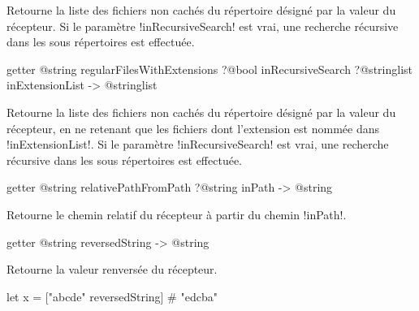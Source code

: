 Retourne la liste des fichiers non cachés du répertoire désigné par la valeur du récepteur. Si le paramètre \ggs!inRecursiveSearch! est vrai, une recherche récursive dans les sous répertoires est effectuée.










\begin{galgasbox}
getter @string regularFilesWithExtensions
    ?@bool inRecursiveSearch
    ?@stringlist inExtensionList -> @stringlist
\end{galgasbox}

Retourne la liste des fichiers non cachés du répertoire désigné par la valeur du récepteur, en ne retenant que les fichiers dont l'extension est nommée dans \ggs!inExtensionList!. Si le paramètre \ggs!inRecursiveSearch! est vrai, une recherche récursive dans les sous répertoires est effectuée.










\begin{galgasbox}
getter @string relativePathFromPath ?@string inPath -> @string
\end{galgasbox}

Retourne le chemin relatif du récepteur à partir du chemin \ggs!inPath!.










\begin{galgasbox}
getter @string reversedString -> @string
\end{galgasbox}

Retourne la valeur renversée du récepteur.

\begin{galgas}
let x = ["abcde" reversedString] # "edcba"
\end{galgas}









